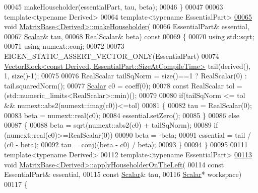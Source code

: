 \begin{DoxyCode}
00045   makeHouseholder(essentialPart, tau, beta);
00046 \}
00047 
00063 \textcolor{keyword}{template}<\textcolor{keyword}{typename} Derived>
00064 \textcolor{keyword}{template}<\textcolor{keyword}{typename} EssentialPart>
\hyperlink{group___core___module_a13291e900f7e81ddc6e5b8802f82092b}{00065} \textcolor{keywordtype}{void} \hyperlink{group___core___module_a13291e900f7e81ddc6e5b8802f82092b}{MatrixBase<Derived>::makeHouseholder}(
00066   EssentialPart& essential,
00067   \hyperlink{group___core___module_a5feed465b3a8e60c47e73ecce83e39a2}{Scalar}& tau,
00068   RealScalar& beta)\textcolor{keyword}{ const}
00069 \textcolor{keyword}{}\{
00070   \textcolor{keyword}{using} std::sqrt;
00071   \textcolor{keyword}{using} numext::conj;
00072   
00073   EIGEN\_STATIC\_ASSERT\_VECTOR\_ONLY(EssentialPart)
00074   \hyperlink{group___core___module_class_eigen_1_1_vector_block}{VectorBlock<const Derived, EssentialPart::SizeAtCompileTime>}
       tail(derived(), 1, size()-1);
00075   
00076   RealScalar tailSqNorm = size()==1 ? RealScalar(0) : tail.squaredNorm();
00077   \hyperlink{group___core___module_a5feed465b3a8e60c47e73ecce83e39a2}{Scalar} c0 = coeff(0);
00078   \textcolor{keyword}{const} RealScalar tol = (std::numeric\_limits<RealScalar>::min)();
00079 
00080   \textcolor{keywordflow}{if}(tailSqNorm <= tol && numext::abs2(numext::imag(c0))<=tol)
00081   \{
00082     tau = RealScalar(0);
00083     beta = numext::real(c0);
00084     essential.setZero();
00085   \}
00086   \textcolor{keywordflow}{else}
00087   \{
00088     beta = sqrt(numext::abs2(c0) + tailSqNorm);
00089     \textcolor{keywordflow}{if} (numext::real(c0)>=RealScalar(0))
00090       beta = -beta;
00091     essential = tail / (c0 - beta);
00092     tau = conj((beta - c0) / beta);
00093   \}
00094 \}
00095 
00111 \textcolor{keyword}{template}<\textcolor{keyword}{typename} Derived>
00112 \textcolor{keyword}{template}<\textcolor{keyword}{typename} EssentialPart>
\hyperlink{group___core___module_a8f2c8059ef3f04cfa0c73b4c012db855}{00113} \textcolor{keywordtype}{void} \hyperlink{group___core___module_a8f2c8059ef3f04cfa0c73b4c012db855}{MatrixBase<Derived>::applyHouseholderOnTheLeft}(
00114   \textcolor{keyword}{const} EssentialPart& essential,
00115   \textcolor{keyword}{const} \hyperlink{group___core___module_a5feed465b3a8e60c47e73ecce83e39a2}{Scalar}& tau,
00116   \hyperlink{group___core___module_a5feed465b3a8e60c47e73ecce83e39a2}{Scalar}* workspace)
00117 \{

\end{DoxyCode}
